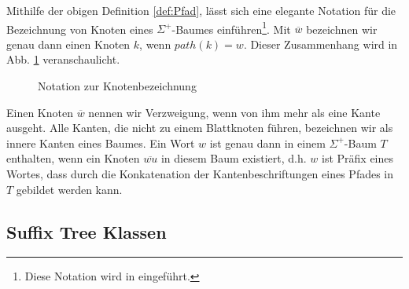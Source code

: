 \documentclass[12pt]{report}
\begin{document}
Mithilfe der obigen Definition \ref{def:Pfad}, lässt sich eine elegante Notation für die Bezeichnung von Knoten eines $\Sigma^+$-Baumes einführen\footnote{Diese Notation wird in \cite{Ukkonen1995} eingeführt.}. Mit $\overline{w}$ bezeichnen wir genau dann einen Knoten $k$, wenn $path(k) = w$. Dieser Zusammenhang wird in Abb. \ref{fig:NotationZurKnotenbezeichnung} veranschaulicht.

\begin{figure}[htb]
\centering
{}
\medskip
\caption{Notation zur Knotenbezeichnung}
\label{fig:NotationZurKnotenbezeichnung}
\end{figure}

Einen Knoten $\overline{w}$ nennen wir Verzweigung, wenn von ihm mehr als eine Kante ausgeht. Alle Kanten, die nicht zu einem Blattknoten führen, bezeichnen wir als innere Kanten eines Baumes. Ein Wort $w$ ist genau dann in einem $\Sigma^+$-Baum $T$ enthalten, wenn ein Knoten $\overline{wu}$ in diesem Baum existiert, d.h. $w$ ist Präfix eines Wortes, dass durch die Konkatenation der Kantenbeschriftungen eines Pfades in $T$ gebildet werden kann.

\subsection{Suffix Tree Klassen}
\label{sec:suffixTreeKlassen}
\end{document}
